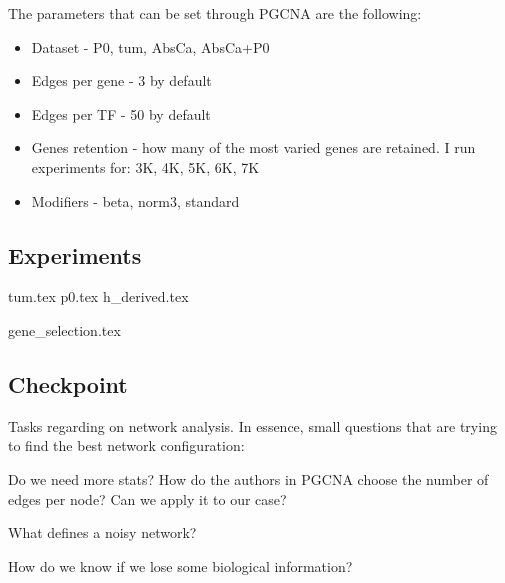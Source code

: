 The parameters that can be set through PGCNA are the following:
\begin{itemize}
    \item Dataset - P0, tum, AbsCa, AbsCa+P0
    \item Edges per gene - 3 by default
    \item Edges per TF - 50 by default
    \item Genes retention - how many of the most varied genes are retained. I run experiments for: 3K, 4K, 5K, 6K, 7K
    \item Modifiers - beta, norm3, standard
\end{itemize}


\subsection{Experiments}

{tum.tex}
\newpage
{p0.tex}
\newpage
{h_derived.tex}
\newpage

{gene_selection.tex}
\newpage

\subsection{Checkpoint}

Tasks regarding on network analysis. In essence, small questions that are trying to find the best network configuration:
\begin{todolist}
    \item Do we need more stats? How do the authors in PGCNA choose the number of edges per node? Can we apply it to our case?
    \item What defines a noisy network?
    \item How do we know if we lose some biological information?
\end{todolist}


